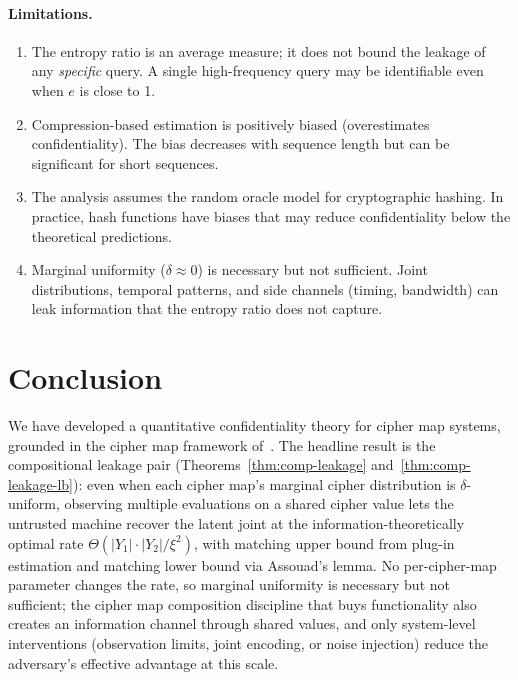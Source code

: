 \documentclass[conference]{IEEEtran}
\theoremstyle{definition}
\theoremstyle{plain}
\theoremstyle{remark}
\begin{document}
\paragraph{Limitations.}
\begin{enumerate}
\item The entropy ratio is an average measure; it does not bound the
  leakage of any \emph{specific} query.  A single high-frequency query
  may be identifiable even when $e$ is close to 1.

\item Compression-based estimation is positively biased (overestimates
  confidentiality).  The bias decreases with sequence length but can be
  significant for short sequences.

\item The analysis assumes the random oracle model for cryptographic
  hashing.  In practice, hash functions have biases that may reduce
  confidentiality below the theoretical predictions.

\item Marginal uniformity ($\delta \approx 0$) is necessary but not
  sufficient.  Joint distributions, temporal patterns, and side channels
  (timing, bandwidth) can leak information that the entropy ratio does
  not capture.
\end{enumerate}


\section{Conclusion}
\label{sec:conclusion}

We have developed a quantitative confidentiality theory for cipher map
systems, grounded in the cipher map framework
of~\cite{towell2026cipher}.  The headline result is the compositional
leakage pair (Theorems~\ref{thm:comp-leakage}
and~\ref{thm:comp-leakage-lb}): even when each cipher map's marginal
cipher distribution is $\delta$-uniform, observing multiple
evaluations on a shared cipher value lets the untrusted machine
recover the latent joint at the information-theoretically optimal
rate $\Theta(|Y_1|\cdot|Y_2|/\xi^2)$, with matching upper bound from
plug-in estimation and matching lower bound via Assouad's lemma.
No per-cipher-map parameter changes the rate, so marginal
uniformity is necessary but not sufficient; the cipher map composition
discipline that buys functionality also creates an information
channel through shared values, and only system-level interventions
(observation limits, joint encoding, or noise injection) reduce the
adversary's effective advantage at this scale.
\end{document}
